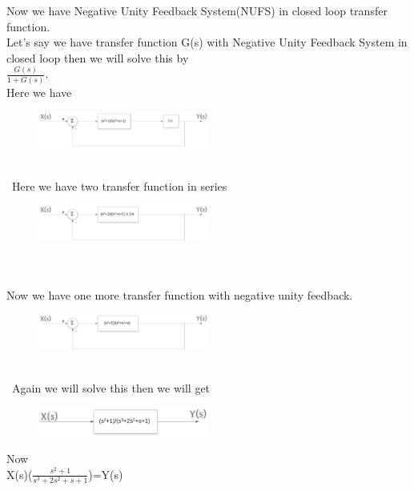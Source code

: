\documentclass[journal,12pt,twocolumn]{IEEEtran}
\renewcommand\thesection{\arabic{section}}
\begin{document}
\begin{enumerate}[label=\arabic*.,ref=\thesection.\theenumi]
Now we have Negative Unity Feedback System(NUFS) in closed loop transfer function. \\Let's say we have transfer function G(s) with Negative Unity Feedback System in closed loop then we will solve this by\\              $\frac{G(s)}{1+G(s)}$.
\\Here we have
\begin{figure}[h]
\includegraphics[width=0.5\textwidth]{./figs/pic4.eps}
\end{figure}
\\\
Here we have two transfer function in series 
\begin{figure}[h]
\includegraphics[width=0.5\textwidth]{./figs/pic5.eps}
\end{figure}
\\\\
Now we have one more transfer function with negative unity feedback.
\begin{figure}[h]
\includegraphics[width=0.5\textwidth]{./figs/pic6.eps}
\end{figure}
\\\
Again we will solve this then we will get
\begin{figure}[h]
\includegraphics[width=0.5\textwidth]{./figs/pic8.eps}
\end{figure}

Now\\

X(s)($\frac{s^2+1}{s^3+2s^2+s+1}$)=Y(s)\\


\end{enumerate}
\end{document}
